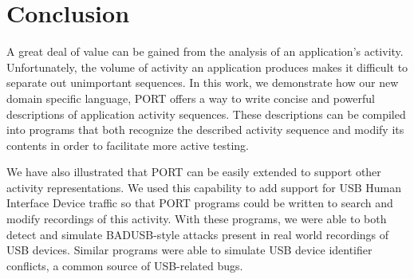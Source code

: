 \section{Conclusion}
\label{sec:Conclusion}
%
%

A great deal of value can be gained from the analysis of an application's
activity.
Unfortunately,
the volume of activity
an application produces
makes it difficult
to separate out
unimportant sequences.
In this work,
we demonstrate how our new domain specific language,
PORT offers
a way to write concise and 
powerful
descriptions of
application activity sequences.
These descriptions
can be compiled
into programs that
both recognize the described activity
sequence
and modify its contents in order to
facilitate more active testing.

We have also
illustrated that PORT
can be
easily extended
to support other activity
representations.
We used this capability to add support for USB Human Interface Device traffic so that PORT programs could be written to search and modify recordings of this activity.
With these programs, we were able to both detect and simulate BADUSB-style attacks present in real world recordings of USB devices.
Similar programs were able to simulate USB device identifier conflicts,
a common source of USB-related bugs.

\clearpage
